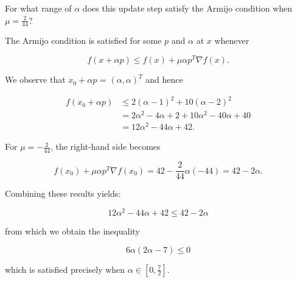For what range of $\alpha$ does this update step satisfy the Armijo condition when $\mu = \frac{2}{44}$?

\begin{solution}
    The Armijo condition is satisfied for some $p$ and $\alpha$ at $x$ whenever

    $$
    f(x + \alpha p) \le f(x) + \mu \alpha p^T \nabla f(x).
    $$

    We observe that $x_0 + \alpha p$ = $(\alpha, \alpha)^T$ and hence

    \begin{align*}
    f(x_0 + \alpha p) &\le 2(\alpha - 1)^2 + 10(\alpha - 2)^2 \\
                      &= 2 \alpha^2 - 4 \alpha + 2 + 10 \alpha^2 - 40 \alpha + 40 \\
                      &= 12 \alpha^2 - 44 \alpha + 42.
    \end{align*}

    For $\mu = -\frac{2}{44}$, the right-hand side becomes

    $$
    f(x_0) + \mu \alpha p^T \nabla f(x_0) = 42 - \frac{2}{44} \alpha \left( -44 \right) = 42 - 2 \alpha.
    $$

    Combining these results yields:

    $$
    12 \alpha^2 - 44 \alpha + 42 \le 42 - 2 \alpha
    $$

    from which we obtain the inequality

    $$
    6 \alpha (2 \alpha - 7) \le 0
    $$

    which is satisfied precisely when $\alpha \in \left[0, \frac{7}{2}\right]$.
    \ \\
\end{solution}
